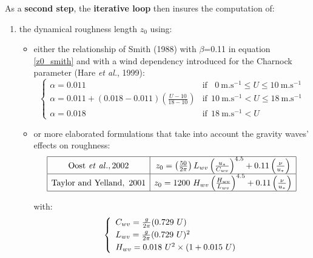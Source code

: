 As a \textbf{second step}, the \textbf{iterative loop} then insures the computation of:
\begin{enumerate}

	\item the dynamical roughness length $z_0$ using:
\begin{itemize}
	\item either the relationship of Smith (1988)\nocite{smith1988} with $\beta$=0.11 in equation \ref{z0_smith} and with a wind dependency 
introduced for the Charnock parameter (Hare \textit{et al.}, 1999\nocite{hare1999}):
\begin{equation}
\left\{
\begin{array}{ll}
	\alpha=0.011 & \mathrm{if}~~~~0~\mathrm{m.s}^{-1}\leq U\leq10~\mathrm{m.s}^{-1} \\
	\alpha=0.011+(0.018-0.011)\left(\frac{U-10}{18-10}\right) & \mathrm{if}~~10~\mathrm{m.s}^{-1}<U\leq18~\mathrm{m.s}^{-1} \\
\alpha=0.018 & \mathrm{if}~~18~\mathrm{m.s}^{-1}<U
\end{array}
\right.
\label{charnockwithwind}\end{equation}
	\item or more elaborated formulations that take into account the gravity waves' effects on roughness: %
\begin{equation}
\begin{array}{|c|c|}
\hline
	\mathrm{Oost}~\mathit{et~al.}, 2002 & z_{0}=\left(\frac{50}{2\pi}\right)L_{wv}\left(\frac{u_{*}}{C_{wv}}\right)^{4.5}+0.11\left(\frac{\nu}{u_{*}}\right)\\
\hline
	\mathrm{Taylor~and~Yelland,~2001} & z_{0}=1200~H_{wv}\left(\frac{H_{wv}}{L_{wv}}\right)^{4.5}+0.11\left(\frac{\nu}{u_{*}}\right)\\
\hline
\end{array}
\end{equation}

with:
\begin{equation}
\left\{
\begin{array}{l}
\vspace*{0.1 cm}
	C_{wv}= \frac{g}{2\pi}(0.729~U)\\
\vspace*{0.1 cm}
	L_{wv}= \frac{g}{2\pi}(0.729~U)^{2}\\
	H_{wv}= 0.018~U^{2}\times(1+0.015~U)
\end{array}
\right.
\end{equation}
\end{itemize}


\end{enumerate}
